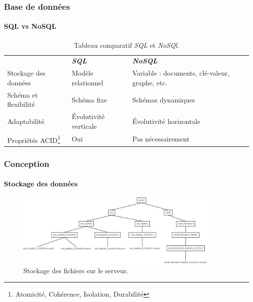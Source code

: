 \documentclass{beamer}
\begin{document}
\begin{frame}
 \frametitle{Base de données}
 \framesubtitle{SQL vs NoSQL}
 \begin{table}[h!]
  \def\arraystretch{1.5}
  \setlength{\fboxsep}{13pt} %
  \setlength{\fboxrule}{0pt} %
  \begin{tabular}{m{2cm}m{4cm}m{4cm}}
   \rowcolor{arkred} 
    \arrayrulecolor{gray73}\hline
    & \color{white} \textbf{\textit{SQL}} &
    \color{white} \textbf{\textit{NoSQL}}\\
    Stockage des données & Modèle relationnel & Variable : documents,
    clé-valeur, graphe, etc.\\
    \hline
    Schéma et flexibilité & Schéma fixe & Schémas dynamiques\\
    \hline
    Adaptabilité & Évolutivité verticale & Évolutivité horizontale\\
    \hline
    Propriétés ACID\footnote{Atomicité, Cohérence, Isolation,
    Durabilité} & Oui & Pas nécessairement\\
  \end{tabular}
  \caption{\label{tabSQLNoSQL} Tableau comparatif \textit{SQL} et
  \textit{NoSQl}.}
\end{table}
\end{frame}

\begin{frame}
 \frametitle{Conception}
 \framesubtitle{Stockage des données}
  \begin{figure}
    \centering
    \includegraphics[width=10cm]{softwareDesign/fileSystemServer.png}
    \caption{Stockage des fichiers sur le serveur.}
  \end{figure}
\end{frame}
\end{document}
